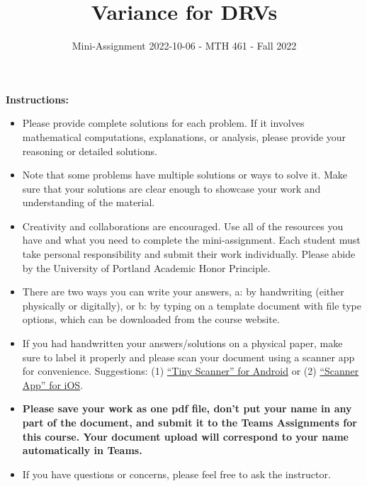 \documentclass[
]{article}
\title{\textbf{Variance for DRVs}}
\subtitle{Mini-Assignment 2022-10-06 - MTH 461 - Fall 2022}
\author{}
\date{\vspace{-2.5em}}
\begin{document}
\maketitle

\hfill\break

\textbf{Instructions:}

\begin{itemize}
\item
  Please provide complete solutions for each problem. If it involves mathematical computations, explanations, or analysis, please provide your reasoning or detailed solutions.
\item
  Note that some problems have multiple solutions or ways to solve it. Make sure that your solutions are clear enough to showcase your work and understanding of the material.
\item
  Creativity and collaborations are encouraged. Use all of the resources you have and what you need to complete the mini-assignment. Each student must take personal responsibility and submit their work individually. Please abide by the University of Portland Academic Honor Principle.
\item
  There are two ways you can write your answers, a: by handwriting (either physically or digitally), or b: by typing on a template document with file type options, which can be downloaded from the course website.
\item
  If you had handwritten your answers/solutions on a physical paper, make sure to label it properly and please scan your document using a scanner app for convenience. Suggestions: (1) \href{https://play.google.com/store/apps/details?id=com.appxy.tinyscanner\&hl=en_US\&gl=US}{``Tiny Scanner'' for Android} or (2) \href{https://apps.apple.com/us/app/scanner-app-scan-pdf-document/id595563753}{``Scanner App'' for iOS}.
\item
  \textbf{Please save your work as one pdf file, don't put your name in any part of the document, and submit it to the Teams Assignments for this course. Your document upload will correspond to your name automatically in Teams.}
\item
  If you have questions or concerns, please feel free to ask the instructor.
\end{itemize}

\newpage
\end{document}

